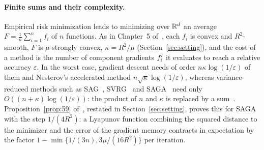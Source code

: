 \paragraph{Finite sums and their complexity.}
Empirical risk minimization leads to minimizing over $\mathbb{R}^d$ an average $F=\frac1n\sum_{i=1}^nf_i$ of $n$
functions. As in Chapter~5
of~\cite{bach2024learning}, each $f_i$ is convex and $R^2$-smooth, $F$ is $\mu$-strongly convex, $\kappa=R^2/\mu$
(Section~\ref{sec:setting}), and the cost of a method is the number of component gradients $f'_i$ it evaluates to
reach a relative accuracy $\varepsilon$. In the worst case, gradient descent needs of order
$n\kappa\log(1/\varepsilon)$ of them and Nesterov's accelerated method $n\sqrt\kappa\log(1/\varepsilon)$, whereas
variance-reduced methods such as SAG~\cite{leroux2012stochastic,schmidt2017minimizing},
SVRG~\cite{johnson2013accelerating} and SAGA~\cite{defazio2014saga} need only $O((n+\kappa)\log(1/\varepsilon))$:
the product of $n$ and $\kappa$ is replaced by a sum~\cite{bach2024learning}. Proposition~\ref{prop:59}
of~\cite{bach2024learning}, restated in Section~\ref{sec:setting}, proves this for SAGA with the step $1/(4R^2)$: a
Lyapunov function combining the squared
distance to the minimizer and the error of the gradient memory contracts in expectation by the factor
$1-\min\{1/(3n),3\mu/(16R^2)\}$ per iteration.

